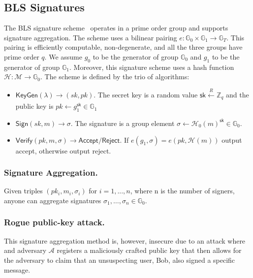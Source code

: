 \subsection{BLS Signatures}

The BLS signature scheme~\cite{bls} operates in a prime order group and supports signature aggregation. The scheme uses a bilinear pairing $e: \mathbb{G}_{0} \times \mathbb{G}_{1}\rightarrow \mathbb{G}_{T}$. This pairing is efficiently computable, non-degenerate, and all the three groups have prime order $q$. We assume $g_{0}$ to be the generator of group $\mathbb{G}_{0}$ and $g_{1}$ to be the generator of group $\mathbb{G}_{1}$. Moreover, this signature scheme uses a hash function $\mathcal{H}: \mathcal{M} \rightarrow \mathbb{G}_{0}$. The scheme is defined by the trio of algorithms:

\begin{itemize}
  \setlength\itemsep{0.35em}

    \item $\mathsf{KeyGen}(\lambda) \rightarrow (sk, pk)$. The secret key is a random value $\mathsf{sk} \xleftarrow[]{R}\mathbb{Z}_{q}$ and the public key is $pk \leftarrow g_{1}^{\mathsf{sk}} \in \mathbb{G}_{1}$
    \item $\mathsf{Sign}(sk, m) \rightarrow \sigma$. The signature is a group element $\sigma \leftarrow \mathcal{H}_{0}(m)^{\mathsf{sk}} \in \mathbb{G}_{0}$.
    \item $\mathsf{Verify}(pk, m, \sigma) \rightarrow \mathsf{Accept/Reject}$. If $e(g_1, \sigma) = e(pk, \mathcal{H}(m))$ output accept, otherwise output reject.
\end{itemize}

\subsubsection{Signature Aggregation.} Given triples $(pk_{i}, m_{i}, \sigma_{i})$ for $i=1, ..., n$, where n is the number of signers, anyone can aggregate signatures $\sigma_{1}, \dots, \sigma_{n}\in \mathbb{G}_{0}$.

\subsubsection{Rogue public-key attack.} This signature aggregation method is, however, insecure due to an attack where and adversary $\mathcal{A}$ registers a maliciously crafted public key that then allows for the adversary to claim that an unsuspecting user, Bob, also signed a specific message. 